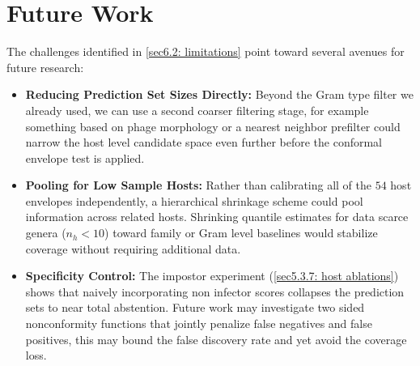\section{Future Work}
\label{sec6.3: future work}

The challenges identified in \ref{sec6.2: limitations} point toward several avenues for future research:

\begin{itemize}
    \item \textbf{Reducing Prediction Set Sizes Directly:} Beyond the Gram type filter we already used, we can use a second
          coarser filtering stage, for example something based on phage morphology or a nearest neighbor prefilter could narrow 
          the host level candidate space even further before the conformal envelope test is applied. 

    \item \textbf{Pooling for Low Sample Hosts:} Rather than calibrating all of the $54$ host envelopes 
           independently, a hierarchical shrinkage scheme could pool information across related hosts. Shrinking quantile 
           estimates for data scarce genera ($n_h < 10$) toward family or Gram level baselines would stabilize coverage 
           without requiring additional data.


    \item \textbf{Specificity Control:} The impostor experiment (\ref{sec5.3.7: host ablations}) shows 
          that naively incorporating non infector scores collapses the prediction sets to near total abstention. Future work 
          may investigate two sided nonconformity functions that jointly penalize false negatives and false positives, 
          this may bound the false discovery rate and yet avoid the coverage loss.
    

\end{itemize}
